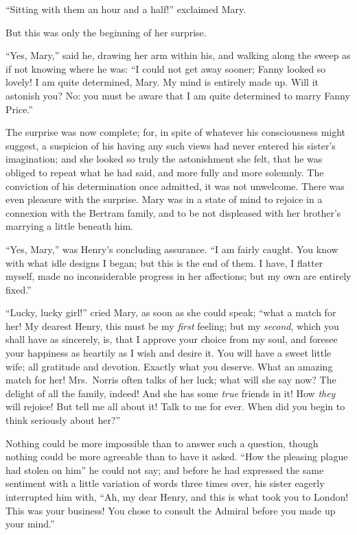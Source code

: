 ``Sitting with them an hour and a half!'' exclaimed Mary.

But this was only the beginning of her surprise.

``Yes, Mary,'' said he, drawing her arm within his,
and walking along the sweep as if not knowing where he was:
``I could not get away sooner; Fanny looked so lovely!
I am quite determined, Mary.  My mind is entirely made up.
Will it astonish you?  No: you must be aware that I am quite
determined to marry Fanny Price.''

The surprise was now complete; for, in spite of whatever
his consciousness might suggest, a suspicion of his having
any such views had never entered his sister's imagination;
and she looked so truly the astonishment she felt, that he
was obliged to repeat what he had said, and more fully
and more solemnly.  The conviction of his determination
once admitted, it was not unwelcome.  There was even
pleasure with the surprise.  Mary was in a state of mind
to rejoice in a connexion with the Bertram family,
and to be not displeased with her brother's marrying
a little beneath him.

``Yes, Mary,'' was Henry's concluding assurance.  ``I am
fairly caught.  You know with what idle designs I began;
but this is the end of them.  I have, I flatter myself,
made no inconsiderable progress in her affections;
but my own are entirely fixed.''

``Lucky, lucky girl!'' cried Mary, as soon as she could speak;
``what a match for her!  My dearest Henry, this must
be my \emph{first} feeling; but my \emph{second}, which you shall
have as sincerely, is, that I approve your choice from
my soul, and foresee your happiness as heartily as I
wish and desire it.  You will have a sweet little wife;
all gratitude and devotion.  Exactly what you deserve.
What an amazing match for her!  Mrs.\ Norris often talks
of her luck; what will she say now?  The delight of all
the family, indeed!  And she has some \emph{true} friends in it!
How \emph{they} will rejoice!  But tell me all about it!
Talk to me for ever.  When did you begin to think seriously
about her?''

Nothing could be more impossible than to answer such
a question, though nothing could be more agreeable than
to have it asked.  ``How the pleasing plague had stolen
on him'' he could not say; and before he had expressed
the same sentiment with a little variation of words
three times over, his sister eagerly interrupted him with,
``Ah, my dear Henry, and this is what took you to London!
This was your business!  You chose to consult the Admiral
before you made up your mind.''

